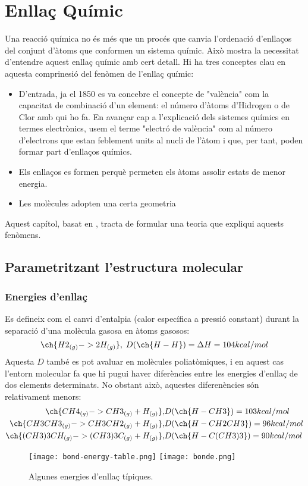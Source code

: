 \chapter{Enllaç Químic}

Una reacció química no és més que un procés que canvia l'ordenació d'enllaços del conjunt d'àtoms que conformen un sistema químic.
Això mostra la necessitat d'entendre aquest enllaç químic amb cert detall.
Hi ha tres conceptes clau en aquesta comprinesió del fenòmen de l'enllaç químic:
\begin{itemize}
\item D'entrada, ja el 1850 es va concebre el concepte de "valència" com la capacitat de combinació d'un element: el número d'àtoms d'Hidrogen o de Clor amb qui ho fa. 
En avançar cap a l'explicació dels sistemes químics en termes electrònics, usem el terme "electró de valència" com al número d'electrons que estan feblement units al nucli de l'àtom i que, per tant, poden formar part d'enllaços químics.
\item Els enllaços es formen perquè permeten els àtoms assolir estats de menor energia.
\item Les molècules adopten una certa geometria
\end{itemize}

Aquest capítol, basat en \citep{mahan_quimica_1997}, tracta de formular una teoria que expliqui aquests fenòmens.

\section{Parametritzant l'estructura molecular}

\subsection{Energies d'enllaç}

Es defineix com el canvi d'entalpia (calor específica a pressió constant) durant la separació d'una molècula gasosa en àtoms gasosos:
\[
\ch{H2_{(g)} -> 2 H_{(g)}}, \; D(\ch{H-H})=\Delta H = 104 kcal/mol
\]
Aquesta $D$ també es pot avaluar en molècules poliatòmiques, i en aquest cas l'entorn molecular fa que hi pugui haver diferències entre les energies d'enllaç de dos elements determinats. No obstant això, aquestes diferenències són relativament menors:
\begin{eqnarray}
\ch{CH4_{(g)} -> CH3_{(g)} + H_{(g)}}, & D(\ch{H-CH3})=103 kcal/mol\\
\ch{CH3CH3_{(g)} -> CH3CH2_{(g)} + H_{(g)}}, & D(\ch{H-CH2CH3})=96 kcal/mol\\
\ch{(CH3)3CH_{(g)} -> (CH3)3C_{(g)}+H_{(g)}}, & D(\ch{H-C(CH3)3})=90 kcal/mol
\end{eqnarray}
\begin{figure}[h]
\centering
\texttt{[image: bond-energy-table.png]}
\texttt{[image: bonde.png]}
\caption{Algunes energies d'enllaç típiques.}
\label{fig:bond-energy-table}
\end{figure}

